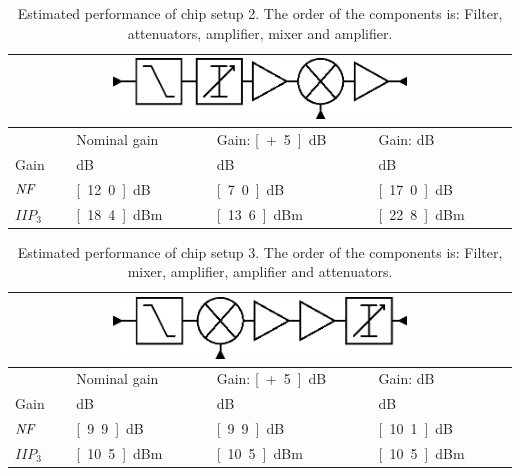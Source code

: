 		\begin{table}[hpt!]
			\caption[Estimated performance of chip setup 2.]{Estimated performance of chip setup 2. The order of the components is: Filter, attenuators, amplifier, mixer and amplifier.}
			\label{tab:confper2}
			\centering
			\begin{tabular}{ l l l l }
				\multicolumn{4}{c}{\includegraphics[width=0.6\textwidth]{fig/system/sys2}} \\\toprule
				& Nominal gain & Gain: \unit[+5]{dB} & Gain: \unit[-5]{dB} \\\midrule
				Gain & \unit[9]{dB} & \unit[14]{dB} & \unit[4]{dB} \\
				$\emph{NF}$ & \unit[12.0]{dB} & \unit[7.0]{dB} & \unit[17.0]{dB} \\
				$IIP_3$ & \unit[18.4]{dBm} & \unit[13.6]{dBm} & \unit[22.8]{dBm} \\\bottomrule
			\end{tabular}
		\end{table}

		\begin{table}[hpt!]
			\caption[Estimated performance of chip setup 3.]{Estimated performance of chip setup 3. The order of the components is: Filter, mixer, amplifier, amplifier and attenuators.}
			\label{tab:confper3}
			\centering
			\begin{tabular}{ l l l l }
				\multicolumn{4}{c}{\includegraphics[width=0.6\textwidth]{fig/system/sys3}} \\\toprule
				& Nominal gain & Gain: \unit[+5]{dB} & Gain: \unit[-5]{dB} \\\midrule
				Gain & \unit[9]{dB} & \unit[14]{dB} & \unit[4]{dB} \\
				$\emph{NF}$ & \unit[9.9]{dB} & \unit[9.9]{dB} & \unit[10.1]{dB} \\
				$IIP_3$ & \unit[10.5]{dBm} & \unit[10.5]{dBm} & \unit[10.5]{dBm} \\\bottomrule
			\end{tabular}
		\end{table}

